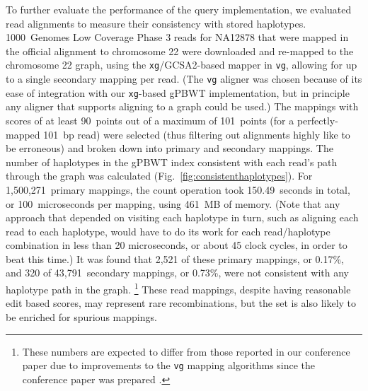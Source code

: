 To further evaluate the performance of the query implementation, we evaluated read alignments to measure their consistency with stored haplotypes. 1000~Genomes Low Coverage Phase 3 reads for NA12878 that were mapped in the official alignment to chromosome 22 were downloaded and re-mapped to the chromosome 22 graph, using the \texttt{xg}/GCSA2-based mapper in \texttt{vg}, allowing for up to a single secondary mapping per read. (The \texttt{vg} aligner was chosen because of its ease of integration with our \texttt{xg}-based gPBWT implementation, but in principle any aligner that supports aligning to a graph could be used.) The mappings with scores of at least 90~points out of a maximum of 101~points (for a perfectly-mapped 101~bp read) were selected (thus filtering out alignments highly like to be erroneous) and broken down into primary and secondary mappings. The number of haplotypes in the gPBWT index consistent with each read's path through the graph was calculated (Fig.~\ref{fig:consistenthaplotypes}). For 1,500,271~primary mappings, the count operation took 150.49~seconds in total, or 100~microseconds per mapping, using 461~MB of memory. (Note that any approach that depended on visiting each haplotype in turn, such as aligning each read to each haplotype, would have to do its work for each read/haplotype combination in less than 20 microseconds, or about 45 clock cycles, in order to beat this time.) It was found that 2,521 of these primary mappings, or 0.17\%, and 320 of 43,791~secondary mappings, or 0.73\%, were not consistent with any haplotype path in the graph. \footnote{These numbers are expected to differ from those reported in our conference paper due to improvements to the \texttt{vg} mapping algorithms since the conference paper was prepared  \cite{novak2016graph}.} These read mappings, despite having reasonable edit based scores, may represent rare recombinations, but the set is also likely to be enriched for spurious mappings.


